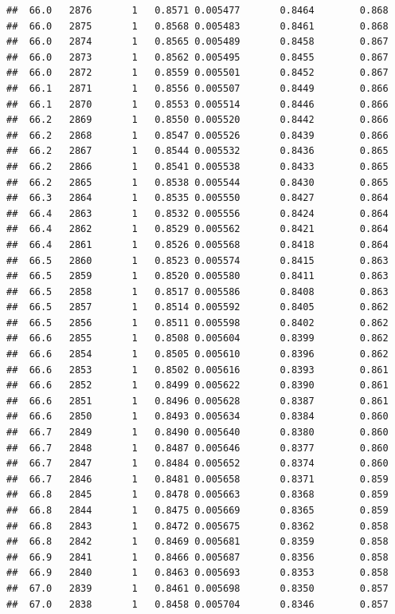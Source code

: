\documentclass[
]{book}
\begin{document}
\begin{verbatim}
##  66.0   2876       1   0.8571 0.005477       0.8464        0.868
##  66.0   2875       1   0.8568 0.005483       0.8461        0.868
##  66.0   2874       1   0.8565 0.005489       0.8458        0.867
##  66.0   2873       1   0.8562 0.005495       0.8455        0.867
##  66.0   2872       1   0.8559 0.005501       0.8452        0.867
##  66.1   2871       1   0.8556 0.005507       0.8449        0.866
##  66.1   2870       1   0.8553 0.005514       0.8446        0.866
##  66.2   2869       1   0.8550 0.005520       0.8442        0.866
##  66.2   2868       1   0.8547 0.005526       0.8439        0.866
##  66.2   2867       1   0.8544 0.005532       0.8436        0.865
##  66.2   2866       1   0.8541 0.005538       0.8433        0.865
##  66.2   2865       1   0.8538 0.005544       0.8430        0.865
##  66.3   2864       1   0.8535 0.005550       0.8427        0.864
##  66.4   2863       1   0.8532 0.005556       0.8424        0.864
##  66.4   2862       1   0.8529 0.005562       0.8421        0.864
##  66.4   2861       1   0.8526 0.005568       0.8418        0.864
##  66.5   2860       1   0.8523 0.005574       0.8415        0.863
##  66.5   2859       1   0.8520 0.005580       0.8411        0.863
##  66.5   2858       1   0.8517 0.005586       0.8408        0.863
##  66.5   2857       1   0.8514 0.005592       0.8405        0.862
##  66.5   2856       1   0.8511 0.005598       0.8402        0.862
##  66.6   2855       1   0.8508 0.005604       0.8399        0.862
##  66.6   2854       1   0.8505 0.005610       0.8396        0.862
##  66.6   2853       1   0.8502 0.005616       0.8393        0.861
##  66.6   2852       1   0.8499 0.005622       0.8390        0.861
##  66.6   2851       1   0.8496 0.005628       0.8387        0.861
##  66.6   2850       1   0.8493 0.005634       0.8384        0.860
##  66.7   2849       1   0.8490 0.005640       0.8380        0.860
##  66.7   2848       1   0.8487 0.005646       0.8377        0.860
##  66.7   2847       1   0.8484 0.005652       0.8374        0.860
##  66.7   2846       1   0.8481 0.005658       0.8371        0.859
##  66.8   2845       1   0.8478 0.005663       0.8368        0.859
##  66.8   2844       1   0.8475 0.005669       0.8365        0.859
##  66.8   2843       1   0.8472 0.005675       0.8362        0.858
##  66.8   2842       1   0.8469 0.005681       0.8359        0.858
##  66.9   2841       1   0.8466 0.005687       0.8356        0.858
##  66.9   2840       1   0.8463 0.005693       0.8353        0.858
##  67.0   2839       1   0.8461 0.005698       0.8350        0.857
##  67.0   2838       1   0.8458 0.005704       0.8346        0.857

\end{verbatim}
\end{document}
